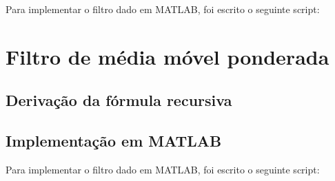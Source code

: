 \documentclass[12pt, a4paper, twoside]{article}
\begin{document}
Para implementar o filtro dado em MATLAB, foi escrito o seguinte script:


\section{Filtro de média móvel ponderada}

\subsection{Derivação da fórmula recursiva}



\subsection{Implementação em MATLAB}

Para implementar o filtro dado em MATLAB, foi escrito o seguinte script:

\end{document}
